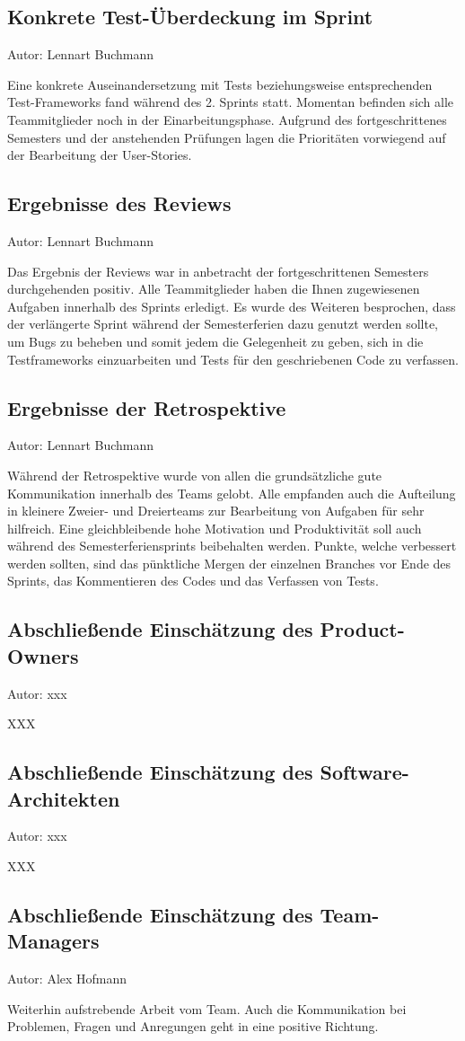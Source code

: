 \subsection{Konkrete Test-Überdeckung im Sprint}
{\small Autor: Lennart Buchmann}

Eine konkrete Auseinandersetzung mit Tests beziehungsweise entsprechenden Test-Frameworks fand während des 2. Sprints statt. Momentan befinden sich alle Teammitglieder noch in der Einarbeitungsphase. Aufgrund des fortgeschrittenes Semesters und der anstehenden Prüfungen lagen die Prioritäten vorwiegend auf der Bearbeitung der User-Stories. 


\subsection{Ergebnisse des Reviews}
{\small Autor: Lennart Buchmann}

Das Ergebnis der Reviews war in anbetracht der fortgeschrittenen Semesters durchgehenden positiv. Alle Teammitglieder haben die Ihnen zugewiesenen Aufgaben innerhalb des Sprints erledigt. 
Es wurde des Weiteren besprochen, dass der verlängerte Sprint während der Semesterferien dazu genutzt werden sollte, um Bugs zu beheben und somit jedem die Gelegenheit zu geben, sich in die Testframeworks einzuarbeiten und Tests für den geschriebenen Code zu verfassen.


\subsection{Ergebnisse der Retrospektive}
{\small Autor:  Lennart Buchmann}

Während der Retrospektive wurde von allen die grundsätzliche gute Kommunikation innerhalb des Teams gelobt. Alle empfanden auch die Aufteilung in kleinere Zweier- und Dreierteams zur Bearbeitung von Aufgaben für sehr hilfreich.  Eine gleichbleibende hohe Motivation und Produktivität soll auch während des Semesterferiensprints beibehalten werden. Punkte, welche verbessert werden sollten, sind das pünktliche Mergen der einzelnen Branches vor Ende des Sprints, das Kommentieren des Codes und das Verfassen von Tests. 


\subsection{Abschließende Einschätzung des Product-Owners}
{\small Autor: xxx}

XXX

\subsection{Abschließende Einschätzung des Software-Architekten}
{\small Autor: xxx}

XXX

\subsection{Abschließende Einschätzung des Team-Managers}
{\small Autor: Alex Hofmann}

Weiterhin aufstrebende Arbeit vom Team. Auch die Kommunikation bei Problemen, Fragen und Anregungen geht in eine positive Richtung.

